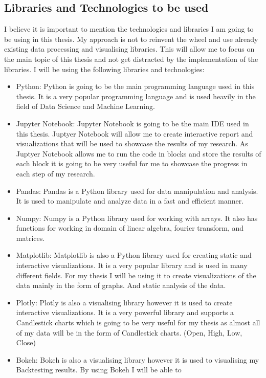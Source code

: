 \documentclass{imc-inf}
\begin{document}
		\subsection{Libraries and Technologies to be used}
			I believe it is important to mention the technologies and libraries I am going to be using in this thesis. My approach is not to reinvent the wheel and 
			use already existing data processing and visualising libraries. This will allow me to focus on the main topic of this thesis and not get distracted by
			the implementation of the libraries. I will be using the following libraries and technologies:
			\begin{itemize}
				\item Python: Python is going to be the main programming language used in this thesis. It is a very popular programming language and is used 
				heavily in the field of Data Science and Machine Learning.
				\item Jupyter Notebook: Jupyter Notebook is going to be the main IDE used in this thesis. Juptyer Notebook will allow me to create interactive
				report and visualizations that will be used to showcase the results of my research. As Juptyer Notebook allows me to run the code in blocks and store
				the results of each block it is going to be very useful for me to showcase the progress in each step of my research.
				\item Pandas: Pandas is a Python library used for data manipulation and analysis. It is used to manipulate and analyze data in a fast and efficient manner.
				\item Numpy: Numpy is a Python library used for working with arrays. It also has functions for working in domain of linear algebra, fourier transform, and matrices.
				\item  Matplotlib: Matplotlib is also a Python library used for creating static and interactive visualizations. It is a very popular library and is used in many different fields.
				For my thesis I will be using it to create visualizations of the data mainly in the form of graphs. And static analysis of the data.
				\item Plotly: Plotly is also a visualising library however it is used to create interactive visualizations. It is a very powerful library and supports a Candlestick
				charts which is going to be very useful for my thesis as almost all of my data will be in the form of Candlestick charts. (Open, High, Low, Close)
				\item Bokeh: Bokeh is also a visualising library however it is used to visualising my Backtesting results. By using Bokeh I will be able to 

\end{itemize}
\end{document}
